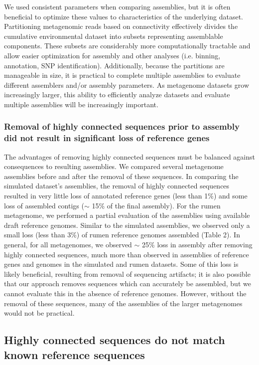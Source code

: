\documentclass[10pt]{article}
\begin{document}
We used consistent parameters when comparing assemblies, but it is often
beneficial to optimize these values to characteristics of the
underlying dataset.  Partitioning metagenomic reads based on
connectivity effectively divides the cumulative environmental dataset
into subsets representing assemblable components.  These subsets are
considerably more computationally tractable and allow easier
optimization for assembly and other analyses (i.e. binning,
annotation, SNP identification).  Additionally, because the partitions
are manageable in size, it is practical to complete multiple
assemblies to evaluate different assemblers and/or assembly
parameters.  As metagenome datasets grow increasingly larger, this
ability to efficiently analyze datasets and evaluate multiple
assemblies will be increasingly important.

\subsubsection*{Removal of highly connected sequences prior to assembly did not result in significant loss of reference genes}
The advantages of removing highly connected sequences must be balanced
against consequences to resulting assemblies.  We compared several
metagenome assemblies before and after the removal of these sequences.
In comparing the simulated dataset's assemblies, the removal of highly
connected sequences resulted in very little loss of annotated
reference genes (less than 1\%) and some loss of assembled contigs ($\sim$ 15\% of the final assembly).  For the rumen metagenome, we performed a partial
evaluation of the assemblies using available draft reference genomes.
Similar to the simulated assemblies, we observed only a small loss
(less than 3\%) of rumen reference genomes assembled (Table 2).  In
general, for all metagenomes, we observed $\sim$ 25\% loss in assembly after
removing highly connected sequences, much more than observed in
assemblies of reference genes and genomes in the simulated and rumen
datasets.  Some of this loss is likely beneficial, resulting from
removal of sequencing artifacts; it is also possible that our approach
removes sequences which can accurately be assembled, but we cannot
evaluate this in the absence of reference genomes.
However, without the
removal of these sequences, many of the assemblies of the larger
metagenomes would not be practical.

\subsection*{Highly connected sequences do not match known reference sequences}
\end{document}
